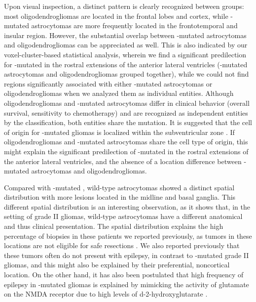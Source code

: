 Upon visual inspection, a distinct pattern is clearly recognized between groups: most oligodendrogliomas are located in the frontal lobes and cortex, while -mutated astrocytomas are more frequently located in the frontotemporal and insular region.
However, the substantial overlap between -mutated astrocytomas and oligodendrogliomas can be appreciated as well.
This is also indicated by our voxel-cluster-based statistical analysis, wherein we find a significant predilection for -mutated  in the rostral extensions of the anterior lateral ventricles (-mutated astrocytomas and oligodendrogliomas grouped together), while we could not find regions significantly associated with either -mutated astrocytomas or oligodendrogliomas when we analyzed them as individual entities.
Although oligodendrogliomas and -mutated astrocytomas differ in clinical behavior (overall survival, sensitivity to chemotherapy) and are recognized as independent entities by the  classification, both entities share the  mutation.
It is suggested that the cell of origin for -mutated gliomas is localized within the subventricular zone \autocite{sanai2005neural}.
If oligodendrogliomas and -mutated astrocytomas share the cell type of origin, this might explain the significant predilection of -mutated  in the rostral extensions of the anterior lateral ventricles, and the absence of a location difference between -mutated astrocytomas and oligodendrogliomas.

Compared with -mutated ,  wild-type astrocytomas showed a distinct spatial distribution with more lesions located in the midline and basal ganglia.
This different spatial distribution is an interesting observation, as it shows that, in the setting of grade II gliomas,  wild-type astrocytomas have a different anatomical and thus clinical presentation.
The spatial distribution explains the high percentage of biopsies in these patients we reported previously, as tumors in these locations are not eligible for safe resections \autocite{wijnenga2017impact}.
We also reported previously \autocite{wijnenga2017impact} that these tumors often do not present with epilepsy, in contrast to -mutated grade II gliomas, and this might also be explained by their preferential, noncortical location.
On the other hand, it has also been postulated that high frequency of epilepsy in -mutated gliomas is explained by mimicking the activity of glutamate on the NMDA receptor due to high levels of d-2-hydroxyglutarate \autocite{chen2017mutant}.

